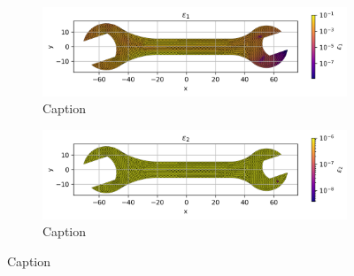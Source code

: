     \begin{figure}[H]
        \centering
        \begin{subfigure}[t]{0.49\textwidth}
        \centering
        \includegraphics[width=\textwidth]{GRAFICOS/Case b - epsilon_1_per_element.png}
        \caption{Caption}
        \label{fig:deformada_reacciones}
        \end{subfigure}
        \hfill
        \begin{subfigure}[t]{0.49\textwidth}
        \centering
        \includegraphics[width=\textwidth]{GRAFICOS/Case b - epsilon_2_per_element.png}
        \caption{Caption}
        \label{fig:von_mises}
        \end{subfigure}
        \caption{Caption}
        \label{fig:analisis_estructural}
    \end{figure}

